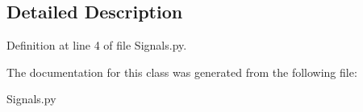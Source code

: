 \subsection{Detailed Description}


Definition at line 4 of file Signals.\+py.



The documentation for this class was generated from the following file\+:\begin{DoxyCompactItemize}
\item 
Signals.\+py\end{DoxyCompactItemize}
